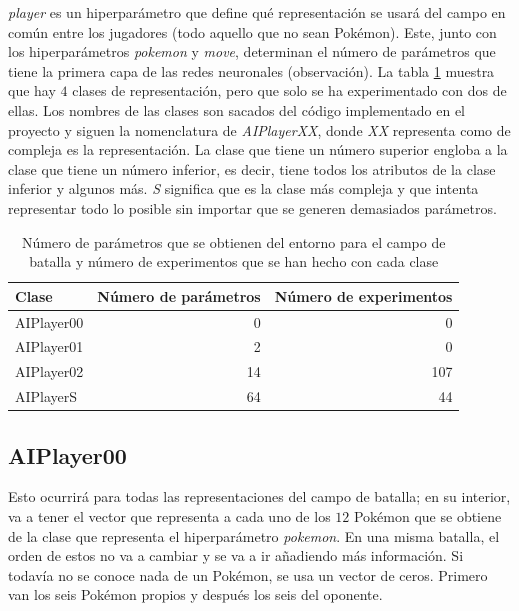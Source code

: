 
\emph{player} es un hiperparámetro que define qué representación se usará del campo en común entre los jugadores (todo aquello que no sean Pokémon). Este, junto con los hiperparámetros \emph{pokemon} y \emph{move}, determinan el número de parámetros que tiene la primera capa de las redes neuronales (observación). La tabla \ref{tab:battleParameters} muestra que hay $4$ clases de representación, pero que solo se ha experimentado con dos de ellas. Los nombres de las clases son sacados del código implementado en el proyecto y siguen la nomenclatura de \emph{AIPlayerXX}, donde \emph{XX} representa como de compleja es la representación. La clase que tiene un número superior engloba a la clase que tiene un número inferior, es decir, tiene todos los atributos de la clase inferior y algunos más. \emph{S} significa que es la clase más compleja y que intenta representar todo lo posible sin importar que se generen demasiados parámetros.

\begin{table}[h]
    \centering
    \begin{tabular}{lrr}
        \toprule
        Clase      & Número de parámetros & Número de experimentos \\
        \midrule
        AIPlayer00 & 0                    & 0                      \\
        AIPlayer01 & 2                    & 0                      \\
        AIPlayer02 & 14                   & 107                    \\
        AIPlayerS  & 64                   & 44                     \\
        \bottomrule
    \end{tabular}
    \caption{Número de parámetros que se obtienen del entorno para el campo de batalla y número de experimentos que se han hecho con cada clase}
    \label{tab:battleParameters}
\end{table}

\subsection*{AIPlayer00}

Esto ocurrirá para todas las representaciones del campo de batalla; en su interior, va a tener el vector que representa a cada uno de los $12$ Pokémon que se obtiene de la clase que representa el hiperparámetro \emph{pokemon}. En una misma batalla, el orden de estos no va a cambiar y se va a ir añadiendo más información. Si todavía no se conoce nada de un Pokémon, se usa un vector de ceros. Primero van los seis Pokémon propios y después los seis del oponente.

